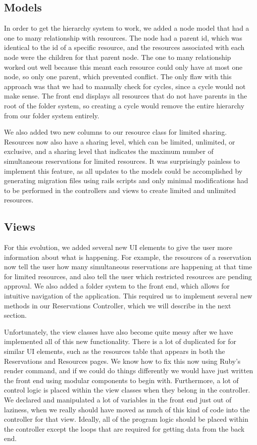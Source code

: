 \documentclass{article}
\begin{document}
\subsection{Models}
In order to get the hierarchy system to work, we added a node model that had a one to many relationship with resources. The node had a parent id, which was identical to the id of a specific resource, and the resources associated with each node were the children for that parent node. The one to many relationship worked out well because this meant each resource could only have at most one node, so only one parent, which prevented conflict. The only flaw with this approach was that we had to manually check for cycles, since a cycle would not make sense.  The front end displays all resources that do not have parents in the root of the folder system, so creating a cycle would remove the entire hierarchy from our folder system entirely.\par
We also added two new columns to our resource class for limited sharing.  Resources now also have a sharing level, which can be limited, unlimited, or exclusive, and a sharing level that indicates the maximum number of simultaneous reservations for limited resources.  It was surprisingly painless to implement this feature, as all updates to the models could be accomplished by generating migration files using rails scripts and only minimal modifications had to be performed in the controllers and views to create limited and unlimited resources.
\subsection{Views}
For this evolution, we added several new UI elements to give the user more information about what is happening.  For example, the resources of a reservation now tell the user how many simultaneous reservations are happening at that time for limited resources, and also tell the user which restricted resources are pending approval.  We also added a folder system to the front end, which allows for intuitive navigation of the application.  This required us to implement several new methods in our Reservations Controller, which we will describe in the next section.\par
Unfortunately, the view classes have also become quite messy after we have implemented all of this new functionality.  There is a lot of duplicated for for similar UI elements, such as the resources table that appears in both the Reservations and Resources pages.  We know how to fix this now using Ruby's render command, and if we could do things differently we would have just written the front end using modular components to begin with.  Furthermore, a lot of control logic is placed within the view classes when they belong in the controller.  We declared and manipulated a lot of variables in the front end just out of laziness, when we really should have moved as much of this kind of code into the controller for that view.  Ideally, all of the program logic should be placed within the controller except the loops that are required for getting data from the back end.
\end{document}
